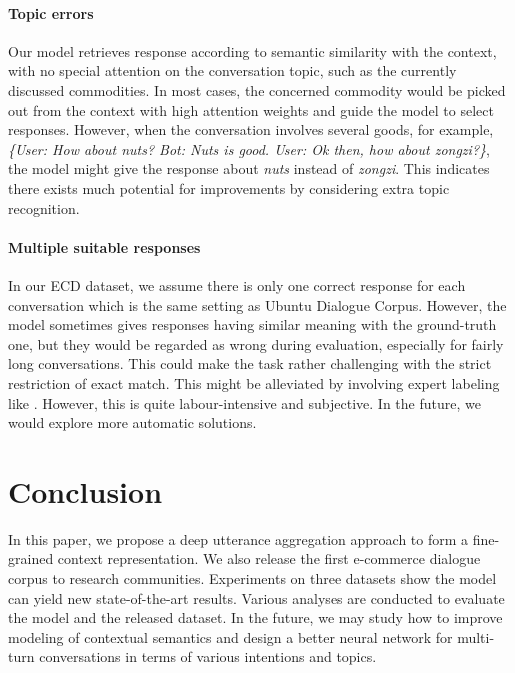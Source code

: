 \documentclass[11pt]{article}
\begin{document}
\paragraph{Topic errors}
Our model retrieves response according to semantic similarity with the context, with no special attention on the conversation topic, such as the currently discussed commodities. In most cases, the concerned commodity would be picked out from the context with high attention weights and guide the model to select responses. However, when the conversation involves several goods, for example, \emph{\{User: How about nuts? Bot: Nuts is good. User: Ok then, how about zongzi?\}}, the model might give the response about \emph{nuts} instead of \emph{zongzi}. This indicates there exists much potential for improvements by considering extra topic recognition.

\paragraph{Multiple suitable responses}
In our ECD dataset, we assume there is only one correct response for each conversation which is the same setting as Ubuntu Dialogue Corpus. However, the model sometimes gives responses having similar meaning with the ground-truth one, but they would be regarded as wrong during evaluation, especially for fairly long conversations. This could make the task rather challenging with the strict restriction of exact match. This  might be alleviated by involving expert labeling like \cite{Wu2016Sequential}. However, this is quite labour-intensive and subjective. In the future, we would explore more automatic solutions. 



\section{Conclusion}
In this paper, we propose a deep utterance aggregation approach to form a fine-grained context representation. We also release the first e-commerce dialogue corpus to research communities. Experiments on three datasets show the model can yield new state-of-the-art results. Various analyses are conducted to evaluate the model and the released dataset. In the future, we may study how to improve modeling of contextual semantics and design a better neural network for multi-turn conversations in terms of various intentions and topics.



\end{document}
